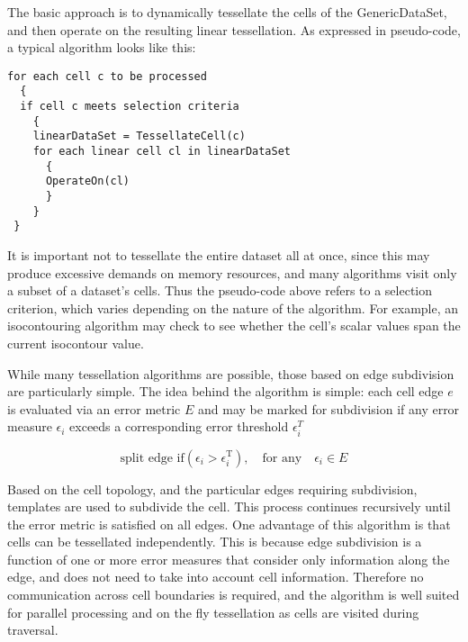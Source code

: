 The basic approach is to dynamically tessellate the cells of the GenericDataSet, and then operate on the resulting linear tessellation. As expressed in pseudo-code, a typical algorithm looks like this:

\begin{lstlisting}[caption={}, numbers=none, frame=none]
for each cell c to be processed
  {
  if cell c meets selection criteria
    {
    linearDataSet = TessellateCell(c)
    for each linear cell cl in linearDataSet
      {
      OperateOn(cl)
      }
    }
 }
\end{lstlisting}

It is important not to tessellate the entire dataset all at once, since this may produce excessive demands on memory resources, and many algorithms visit only a subset of a dataset's cells. Thus the pseudo-code above refers to a selection criterion, which varies depending on the nature of the algorithm. For example, an isocontouring algorithm may check to see whether the cell's scalar values span the current isocontour value.

While many tessellation algorithms are possible, those based on edge subdivision are particularly simple. The idea behind the algorithm is simple: each cell edge $e$ is evaluated via an error metric $E$ and may be marked for subdivision if any error measure $\epsilon_i$ exceeds a corresponding error threshold $\epsilon_i^T$  

\begin{equation}\label{eq:8.7}
\text{split edge if} (\epsilon_i > \epsilon_i^{\text{T}}), \quad \text{for any} \quad \epsilon_i \in E
\end{equation}

Based on the cell topology, and the particular edges requiring subdivision, templates are used to subdivide the cell. This process continues recursively until the error metric is satisfied on all edges. One advantage of this algorithm is that cells can be tessellated independently. This is because edge subdivision is a function of one or more error measures that consider only information along the edge, and does not need to take into account cell information. Therefore no communication across cell boundaries is required, and the algorithm is well suited for parallel processing and on the fly tessellation as cells are visited during traversal.

